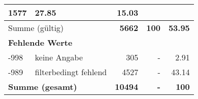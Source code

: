 \begin{longtable}{lXrrr}
       \num{1577} &
       \num[round-mode=places,round-precision=2]{27.85} &
         \num[round-mode=places,round-precision=2]{15.03} \\
     \midrule
     \multicolumn{2}{l}{Summe (gültig)} &
       \textbf{\num{5662}} &
     \textbf{\num{100}} &
       \textbf{\num[round-mode=places,round-precision=2]{53.95}} \\
     \multicolumn{5}{l}{\textbf{Fehlende Werte}}\\
       -998 &
       keine Angabe &
         \num{305} &
        - &
         \num[round-mode=places,round-precision=2]{2.91} \\
       -989 &
       filterbedingt fehlend &
         \num{4527} &
        - &
         \num[round-mode=places,round-precision=2]{43.14} \\
     \midrule
     \multicolumn{2}{l}{\textbf{Summe (gesamt)}} &
          \textbf{\num{10494}} &
        \textbf{-} &
        \textbf{\num{100}} \\
     \bottomrule
     \end{longtable}
     
